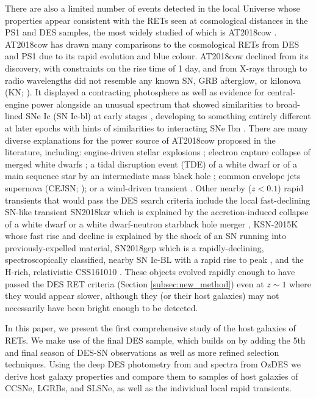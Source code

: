 \documentclass[fleqn,usenatbib,]{mnras}
\newcommand{\replyref}[1]{\color{magenta}#1 \color{black}}
\begin{document}
There are also a limited number of events detected in the local Universe whose properties appear consistent with the RETs seen at cosmological distances in the PS1 and DES samples, the most widely studied of which is AT2018cow \citep[e.g.][]{Prentice2018,Margutti2019,Perley2019}. \replyref{AT2018cow has drawn many comparisons to the cosmological RETs from DES and PS1 \citep[e.g.][]{Perley2019,Margutti2019,Fox2019,Mohan2020} due to its rapid evolution and blue colour. AT2018cow declined from its discovery, with constraints on the rise time of 1 day, and from X-rays through to radio wavelengths did not resemble any known SN, GRB afterglow, or kilonova (KN; \citealt{Ho2019}). It displayed a contracting photosphere as well as evidence for central-engine power alongside an unusual spectrum that showed similarities to broad-lined SNe Ic (SN Ic-bl) at early stages \citep[e.g.][]{Xu2018,Izzo2018}, developing to something entirely different at later epochs \citep{Perley2019} with hints of similarities to interacting SNe Ibn \citep{Fox2019}.} There are many diverse explanations for the power source of AT2018cow \replyref{proposed} in the literature, including: \replyref{engine-driven stellar explosions \citep{Ho2019,Margutti2019,Mohan2020}}; electron capture collapse of merged white dwarfs \citep{Lyutikov2019}; a tidal disruption event (TDE) of a white dwarf \citep{Kuin2019} or of a main sequence star by an intermediate mass black hole \citep{Perley2019}; common envelope jets supernova (CEJSN; \citealt{Soker2019}); or a wind-driven transient \citep{Piro2020,Uno2020}.
Other nearby \replyref{($z<0.1$)} rapid transients \replyref{that would pass the DES search criteria} include the local fast-declining SN-like transient SN2018kzr \citep{McBrien2019} which is explained by the accretion-induced collapse of a white dwarf or a white dwarf-neutron star\replyref{black hole} merger \citep{Gillanders2020}, KSN-2015K \citep{Rest2018} whose fast rise and decline is explained by the shock of an SN running into previously-expelled material, \replyref{SN2018gep \citep{Ho2019a} \replyref{which is a rapidly-declining, spectroscopically classified, nearby SN Ic-BL with a rapid rise to peak}, and the H-rich, relativistic CSS161010 \citep{Coppejans2020}.} \replyref{These objects evolved rapidly enough to have passed the DES RET criteria (Section \ref{subsec:new_method}) even at $z\sim1$ where they would appear slower, although they (or their host galaxies) may not necessarily have been bright enough to be detected.}

In this paper, we present the first comprehensive study of the host galaxies of RETs. We make use of the final DES sample, which builds on  by adding the 5th and final season of DES-SN observations as well as more refined selection techniques. Using the deep DES photometry from \citet[hereafter W20]{Wiseman2020} and spectra from OzDES \citep{Lidman2020} we derive host galaxy properties and compare them to samples of host galaxies of CCSNe, LGRBs, and SLSNe, as well as the individual local rapid transients. 
\end{document}
